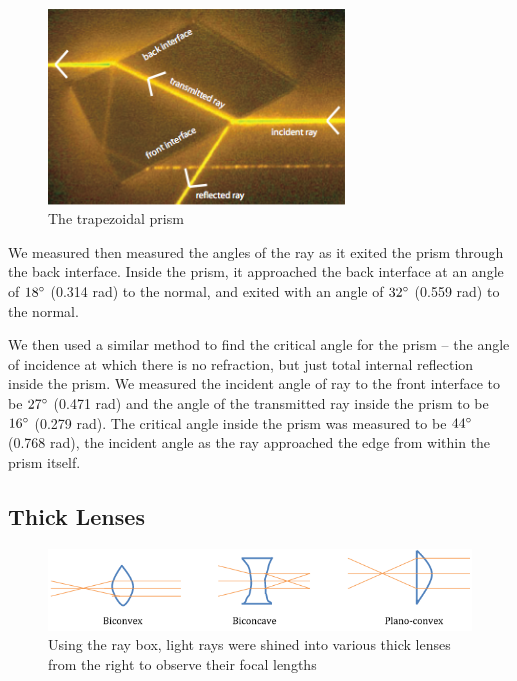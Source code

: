 \documentclass{article}
\begin{document}
\begin{figure}[H]
    \centering
    \includegraphics[width=0.7\textwidth]{charts/trapezoidal_prism}
    \caption{The trapezoidal prism}
    \label{trapezoidal_prism}
\end{figure}

We measured then measured the angles of the ray as it exited the prism through
the back interface. Inside the prism, it approached the back interface at an
angle of $18 \degree$ (0.314 rad) to the normal, and exited with an angle of $32
\degree$ (0.559 rad) to the normal.

We then used a similar method to find the critical angle for the prism – the
angle of incidence at which there is no refraction, but just total internal
reflection inside the prism. We measured the incident angle of ray to the front
interface to be $27 \degree$ (0.471 rad) and the angle of the transmitted ray
inside the prism to be $16 \degree$ (0.279 rad). The critical angle inside the
prism was measured to be $44 \degree$ (0.768 rad), the incident angle as the ray
approached the edge from within the prism itself.

\subsection{Thick Lenses}

\begin{figure}[H]
    \centering
    \includegraphics[width=\textwidth]{charts/thick_lenses}
    \caption{Using the ray box, light rays were shined into various thick lenses
    from the right to observe their focal lengths}
    \label{thick_lenses}
\end{figure}
\end{document}
